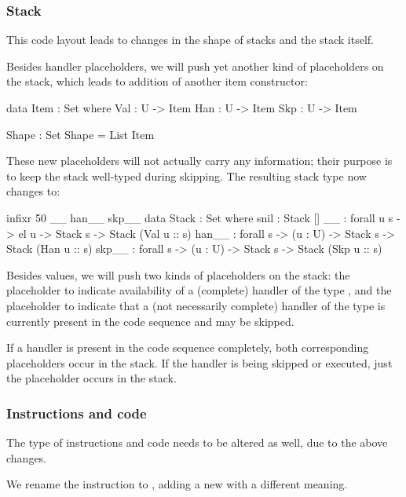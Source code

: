 \subsubsection{Stack}

This code layout leads to changes in the shape of stacks and the stack itself.

Besides handler placeholders, we will push yet another kind of placeholders on
the stack, which leads to addition of another item constructor:
\begin{code}
  data Item : Set where
    Val : U -> Item
    Han : U -> Item
    Skp : U -> Item

  Shape : Set
  Shape = List Item
\end{code}
\noindent These new placeholders will not actually carry any information; their
purpose is to keep the stack well-typed during skipping. The resulting stack type
now changes to:
\begin{code}
  infixr 50 _\scons\_ han_\scons\_ skp_\scons\_
  data Stack : Set where
    snil : Stack []
    _\scons\_ : forall {u s} -> el u -> Stack s -> Stack (Val u :: s)
    han_\scons\_ : forall {s} -> (u : U) -> Stack s -> Stack (Han u :: s)
    skp_\scons\_ : forall {s} -> (u : U) -> Stack s -> Stack (Skp u :: s)
\end{code}
\noindent Besides values, we will push two kinds of placeholders on the stack:
the placeholder  to indicate availability of a (complete) handler
of the type , and the placeholder  to indicate that a
(not necessarily complete) handler of the type  is currently present
in the code sequence and may be skipped.

If a handler is present in the code sequence completely, both corresponding
placeholders occur in the stack. If the handler is being skipped or executed,
just the  placeholder occurs in the stack.

\subsubsection{Instructions and code}

The type of instructions and code needs to be altered as well, due to the above
changes.

We rename the instruction  to , adding a new
 with a different meaning.

